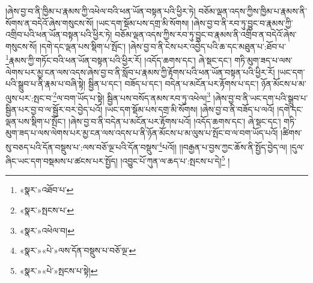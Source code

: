 །ཞེས་བྱ་བ་ནི་ཁྱིམ་པ་རྣམས་ཀྱི་འཕེལ་བའི་ཕན་ཡོན་བསྟན་པའི་ཕྱིར་ཏེ། བཅོམ་ལྡན་འདས་ཀྱིས་ཁྱིམ་པ་རྣམས་ནི་སོགས་ན་བདེའོ་ཞེས་གསུངས་སོ། །ཡང་དག་སྡོམ་པས་དགྲ་མི་སོགས། །ཞེས་བྱ་བ་ནི་རབ་ཏུ་བྱུང་བ་རྣམས་ཀྱི་འགྲིབ་པའི་ཕན་ཡོན་བསྟན་པའི་ཕྱིར་ཏེ། བཅོམ་ལྡན་འདས་ཀྱིས་རབ་ཏུ་བྱུང་བ་རྣམས་ནི་འགྲིབ་ན་བདེའོ་ཞེས་གསུངས་སོ། །དགེ་དང་ལྡན་པས་སྡིག་པ་སྤོང་། །ཞེས་བྱ་བ་ནི་ངེས་པར་འབྱེད་པའི་ཆ་དང་མཐུན་པ་:ཐོབ་པ་\footnote{«སྣར་»འཐོབ་པ་}རྣམས་ཀྱི་གཏོང་བའི་ཕན་ཡོན་བསྟན་པའི་ཕྱིར་རོ། །འདོད་ཆགས་དང་། ཞེ་སྡང་དང་། གཏི་མུག་ཟད་པ་ལས་ལེགས་པར་མྱ་ངན་ལས་འདས་ཞེས་བྱ་བ་ནི་སློབ་པ་རྣམས་ཀྱི་རྟོགས་པའི་ཕན་ཡོན་བསྟན་པའི་ཕྱིར་རོ། །ཡང་དག་པའི་སྒྲུབ་པ་ནི་རྣམ་པ་བཞི་སྟེ། སྦྱིན་པ་དང་། བཟོད་པ་དང་། བདེན་པ་མངོན་པར་རྟོགས་པ་དང་། ཉོན་མོངས་པ་མ་ལུས་པར་:སྤང་བ་\footnote{«སྣར་»སྤངས་པ་}ལ་བག་ཡོད་པ་སྟེ། སྦྱིན་པས་བསོད་ནམས་རབ་ཏུ་འཕེལ།\footnote{«སྣར་»འཕེལ་བ།} །ཞེས་བྱ་བ་ནི་ཡང་དག་པའི་སྒྲུབ་པ་སྦྱིན་པར་བྱ་བ་ལ་སྦྱོར་བར་བྱེད་པའོ། །ཡང་དག་སྡོམ་པས་དགྲ་མི་སོགས། །ཞེས་བྱ་བ་ནི་བཟོད་པ་ལའོ། །དགེ་དང་ལྡན་པས་སྡིག་པ་སྤོང་། །ཞེས་བྱ་བ་ནི་བདེན་པ་མངོན་པར་རྟོགས་པའོ། །འདོད་ཆགས་དང་། ཞེ་སྡང་དང་། གཏི་མུག་ཟད་པ་ལས་ལེགས་པར་མྱ་ངན་ལས་འདས་པ་ནི་ཉོན་མོངས་པ་མ་ལུས་པ་སྤོང་བ་ལ་བག་ཡོད་པའོ། །ཚིགས་སུ་བཅད་པའི་དོན་བསྡུས་པ་:ལས་བཅོ་ལྔ་པའི་དོན་བསྡུས་\footnote{«སྣར་»«པེ་»ལས་དོན་བསྡུས་པ་བཅོ་ལྔ་}པའོ།། །།བརྒྱན་པ་བྱས་ཀྱང་ཆོས་ནི་སྤྱོད་བྱེད་ལ། །དུལ་ཞིང་ཡང་དག་བསྡམས་པ་ཚངས་པར་སྤྱོད། །འབྱུང་པོ་ཀུན་ལ་ཆད་པ་:སྤངས་པ་དེ།\footnote{«སྣར་»«པེ་»སྤངས་པ་སྟེ།} །
